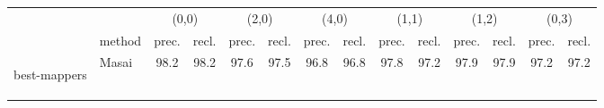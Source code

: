 \documentclass[a4,center,fleqn]{article}
\begin{document}
\begin{table*}[t]
  \caption[Variant detection results]
  {
  \label{tab:Variant}
    {\bfseries Variant detection results.} We show the percentages of found origins (recall) and fraction of unique reads mapped to their origin (precision) classed by reads with  SNPs and  indels .
  }
  \vspace{-3mm}
  \center
  \sffamily
  \resizebox{1.0\textwidth}{!}
  {
	\renewcommand{\tabcolsep}{0.8ex}
	\begin{tabular}{llcccccccccccc}
  \toprule & & \multicolumn{2}{c}{(0,0)} & \multicolumn{2}{c}{(2,0)} & \multicolumn{2}{c}{(4,0)} & \multicolumn{2}{c}{(1,1)} & \multicolumn{2}{c}{(1,2)} & \multicolumn{2}{c}{(0,3)}\\ & method & {  prec.} & {  recl.} & {  prec.} & {  recl.} & {  prec.} & {  recl.} & {  prec.} & {  recl.} & {  prec.} & {  recl.} & {  prec.} & {  recl.} \\ 
  \midrule \multirow{4}{*}{\begin{sideways}\footnotesize best-mappers\hspace{0.3ex} \end{sideways}} & {Masai} & \cellcolor[rgb]{0.483493105779184,0.708752269124095,0.536862845222734}\phantom{0}98.2 & \cellcolor[rgb]{0.484023441732326,0.708719123127024,0.536781821674337}\phantom{0}98.2 & \cellcolor[rgb]{0.509629000004351,0.707118775735022,0.532869861382778}\phantom{0}97.6 & \cellcolor[rgb]{0.513967585872862,0.70684761411824,0.532207021875088}\phantom{0}97.5 & \cellcolor[rgb]{0.539720023075151,0.705238086793097,0.528272621746961}\phantom{0}96.8 & \cellcolor[rgb]{0.539720023075151,0.705238086793097,0.528272621746961}\phantom{0}96.8 & \cellcolor[rgb]{0.499300188712104,0.707764326440788,0.534447874219093}\phantom{0}97.8 & \cellcolor[rgb]{0.525697120480496,0.706114518205263,0.530415009643367}\phantom{0}97.2 & \cellcolor[rgb]{0.494309563102447,0.708076240541391,0.535210330909457}\phantom{0}97.9 & \cellcolor[rgb]{0.494309563102447,0.708076240541391,0.535210330909457}\phantom{0}97.9 & \cellcolor[rgb]{0.524988045587848,0.706158835386054,0.530523340529743}\phantom{0}97.2 & \cellcolor[rgb]{0.524988045587848,0.706158835386054,0.530523340529743}\phantom{0}97.2 \\ 

\end{tabular}}
\end{table*}
\end{document}
